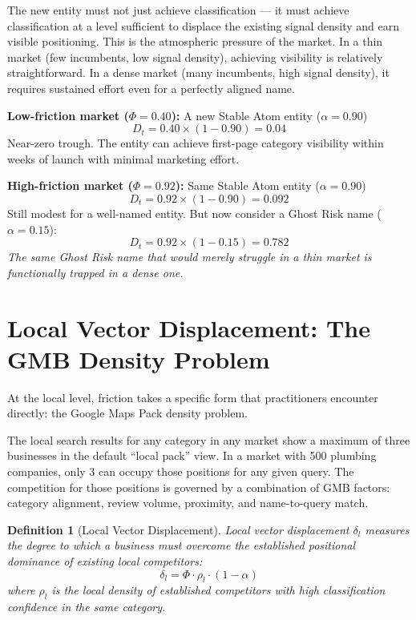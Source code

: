 \documentclass[12pt, openany]{book}
\theoremstyle{thmstyle}
\theoremstyle{defstyle}
\newtheorem{definition}{Definition}[chapter]
\begin{document}
The new entity must not just achieve classification --- it must achieve classification at a level sufficient to displace the existing signal density and earn visible positioning. This is the atmospheric pressure of the market. In a thin market (few incumbents, low signal density), achieving visibility is relatively straightforward. In a dense market (many incumbents, high signal density), it requires sustained effort even for a perfectly aligned name.

\begin{calcbox}
\textbf{Low-friction market ($\Phi = 0.40$):} A new Stable Atom entity ($\alpha = 0.90$)
\[
D_t = 0.40 \times (1 - 0.90) = 0.04
\]
Near-zero trough. The entity can achieve first-page category visibility within weeks of launch with minimal marketing effort.

\vspace{8pt}
\textbf{High-friction market ($\Phi = 0.92$):} Same Stable Atom entity ($\alpha = 0.90$)
\[
D_t = 0.92 \times (1 - 0.90) = 0.092
\]
Still modest for a well-named entity. But now consider a Ghost Risk name ($\alpha = 0.15$):
\[
D_t = 0.92 \times (1 - 0.15) = 0.782
\]
\textit{The same Ghost Risk name that would merely struggle in a thin market is functionally trapped in a dense one.}
\end{calcbox}

\section{Local Vector Displacement: The GMB Density Problem}

At the local level, friction takes a specific form that practitioners encounter directly: the Google Maps Pack density problem.

The local search results for any category in any market show a maximum of three businesses in the default ``local pack'' view. In a market with 500 plumbing companies, only 3 can occupy those positions for any given query. The competition for those positions is governed by a combination of GMB factors: category alignment, review volume, proximity, and name-to-query match.

\begin{definition}[Local Vector Displacement]
Local vector displacement $\delta_l$ measures the degree to which a business must overcome the established positional dominance of existing local competitors:
\[
\delta_l = \Phi \cdot \rho_l \cdot (1 - \alpha)
\]
where $\rho_l$ is the local density of established competitors with high classification confidence in the same category.
\end{definition}
\end{document}

